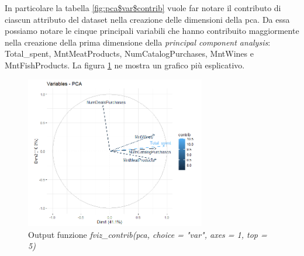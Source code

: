 \documentclass[letterpaper,11pt]{article}
\begin{document}
In particolare la tabella \ref{fig:pca$var$contrib} vuole far notare il contributo di ciascun attributo del dataset nella creazione delle dimensioni della pca. Da essa possiamo notare le cinque principali variabili che hanno contribuito maggiormente nella creazione della prima dimensione della \textit{principal component analysis}: Total\_spent, MntMeatProducts, NumCatalogPurchases, MntWines e MntFishProducts. La figura \ref{fig:fviz_contrib(pca, choice = "var", axes = 1, top = 5)} ne mostra un grafico più esplicativo.
\begin{figure}[h!]
    \centering
    \includegraphics[width=0.7\textwidth]{Img/PCA/Rplot04.png}
    \caption{Output funzione \textit{fviz\_contrib(pca, choice = "var", axes = 1, top = 5)}}
    \label{fig:fviz_contrib(pca, choice = "var", axes = 1, top = 5)}
\end{figure}
\end{document}

